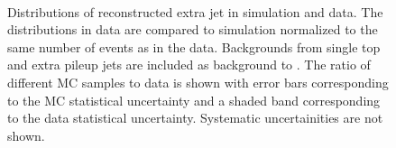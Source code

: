 \begin{figure}
\centering
{}
\\
\caption{Distributions of reconstructed extra jet \pt in simulation and data. The distributions in data are compared to \ttbar simulation normalized to the same number of events as in the data. Backgrounds from single top and extra pileup jets are included as background to \ttbar. The ratio of different MC samples to data is shown with error bars corresponding to the MC statistical uncertainty and a shaded band corresponding to the data statistical uncertainty. Systematic uncertainities are not shown.}
\label{fig:recojetpt}
\end{figure}

